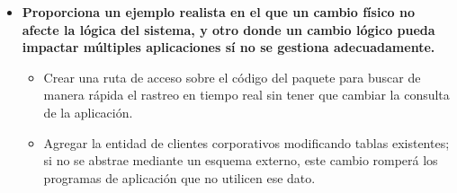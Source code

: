 \begin{itemize}
    \item \textbf{Proporciona un ejemplo realista en el que un cambio físico no afecte la lógica del sistema, y otro donde un cambio lógico pueda impactar múltiples aplicaciones sí no se gestiona adecuadamente.}

    \begin{itemize}
        \item Crear una ruta de acceso sobre el código del paquete para buscar de manera rápida el rastreo en tiempo real sin tener que cambiar la consulta de la aplicación.
        \item Agregar la entidad de clientes corporativos modificando tablas existentes; si no se abstrae mediante un esquema externo, este cambio romperá los programas de aplicación que no utilicen ese dato.
    \end{itemize}
\end{itemize}
 


